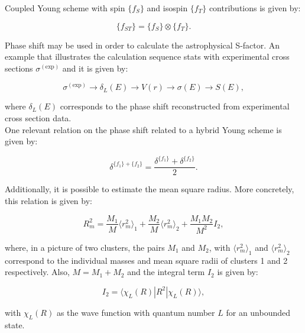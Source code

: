 \documentclass[openany]{book}
\begin{document}
Coupled Young scheme with spin $\{f_S\}$ and isospin $\{f_T\}$  contributions is given by: 

\begin{equation}\label{eq:potential_Young_coupled}
	\{f_{ST}\} = \{f_S\} \otimes \{f_T\}.
\end{equation}

Phase shift may be used in order to calculate the astrophysical S-factor. An example that illustrates the calculation sequence stats with experimental cross sections $\sigma^{(\mathrm{exp})}$ and it is given by:

\begin{equation}\label{eq:potential_phaseShift_sequence}
	\sigma^{(\mathrm{exp})} \rightarrow \delta_L(E) \rightarrow V(r) \rightarrow \sigma(E) \rightarrow S(E),
\end{equation}

where $\delta_L(E)$ corresponds to the phase shift reconstructed from experimental cross section data. \\

One relevant relation on the phase shift related to a hybrid Young scheme is given by: 

\begin{equation}\label{eq:potential_phaseShift_sumRule}
	\delta^{\{f_1\} + \{f_2\}} = \frac{\delta^{\{f_1\}} + \delta^{\{f_2\}} }{2}.
\end{equation}

Additionally, it is possible to estimate the mean square radius. More concretely, this relation is given by:

\begin{equation}\label{eq:potential_meanRadius_mass}
	R^2_m = \frac{M_1}{M} \langle r^{2}_{m} \rangle_1 +   \frac{M_2}{M} \langle r^{2}_{m} \rangle_2 + \frac{M_1M_2}{M^2}I_2,
\end{equation}

where, in a picture of two clusters, the pairs $M_1$ and $M_2$, with  $\langle r^{2}_{m} \rangle_1$ and $\langle r^{2}_{m} \rangle_2$ correspond to the individual masses and mean square radii of clusters 1 and 2 respectively. Also, $M = M_1 + M_2$ and the integral term $I_2$ is given by:

\begin{equation}\label{eq:potential_meanRadius_I_2}
	I_2 = \langle \chi_{L} (R) | R^2 | \chi_{L} (R)   \rangle, 
\end{equation}

with $\chi_{L} (R)$ as the wave function with quantum number $L$ for an unbounded state. \\
\end{document}
